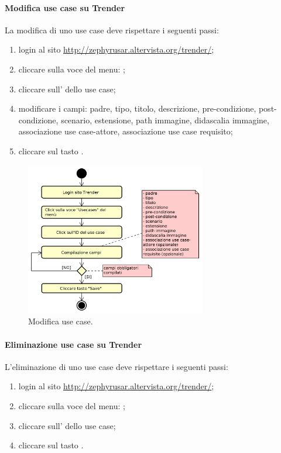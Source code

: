 	    \paragraph{Modifica use case su Trender}
	    La modifica di uno use case deve rispettare i seguenti passi:
	    \begin{enumerate}
	    	\item login al sito \url{http://zephyrusar.altervista.org/trender/};
	    	\item cliccare sulla voce del menu: ;
	    	\item cliccare sull' dello use case;
	    	\item modificare i campi: padre, tipo, titolo, descrizione, pre-condizione, post-condizione, scenario, estensione, path immagine, didascalia immagine, associazione use case-attore, associazione use case requisito;
	    	\item cliccare sul tasto .
	    \end{enumerate}
	    \begin{figure}[H]
	    	\centering
	    	\includegraphics[width=0.7\textwidth]{img/ModificaUC}
	    	\caption{Modifica use case.}
	    \end{figure}
	    
	    \paragraph{Eliminazione use case su Trender}
	    L'eliminazione di uno use case deve rispettare i seguenti passi:
	    \begin{enumerate}
	    	\item login al sito \url{http://zephyrusar.altervista.org/trender/};
	    	\item cliccare sulla voce del menu: ;
	    	\item cliccare sull' dello use case;
	    	\item cliccare sul tasto .
	    \end{enumerate}


